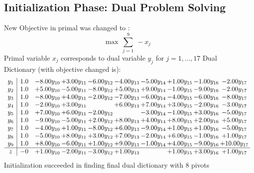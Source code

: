 \documentclass[9pt]{article}
\begin{document}
\subsection{Initialization Phase: Dual Problem Solving}
New Objective in primal was changed to : \[ \max\ \sum_{j=1}^{9}\ - x_j \] 
Primal variable $x_j$ corresponds to dual variable $y_j$ for $j = 1,\ldots,17$
Dual Dictionary (with objective changed is): 
\[\begin{array}{c| c c@{\hskip 2pt} c@{\hskip 2pt} c@{\hskip 2pt} c@{\hskip 2pt} c@{\hskip 2pt} c@{\hskip 2pt} c@{\hskip 2pt} c@{\hskip 2pt} }
 y_{1}   &  1.0 & -8.00 y_{10} & +  3.00 y_{11} & -6.00 y_{12} & -4.00 y_{13} & -5.00 y_{14} & +  1.00 y_{15} & -1.00 y_{16} & -2.00 y_{17}\\
 y_{2}   &  1.0 & +  5.00 y_{10} & -5.00 y_{11} & -8.00 y_{12} & +  5.00 y_{13} & +  9.00 y_{14} & -1.00 y_{15} & -9.00 y_{16} & -2.00 y_{17}\\
 y_{3}   &  1.0 & -8.00 y_{10} & +  4.00 y_{11} & -2.00 y_{12} & -7.00 y_{13} & -6.00 y_{14} & -4.00 y_{15} & -6.00 y_{16} & -8.00 y_{17}\\
 y_{4}   &  1.0 & -2.00 y_{10} & +  3.00 y_{11} &   & +  6.00 y_{13} & +  7.00 y_{14} & +  3.00 y_{15} & -2.00 y_{16} & -3.00 y_{17}\\
 y_{5}   &  1.0 & +  7.00 y_{10} & +  6.00 y_{11} & -2.00 y_{12} &   & -3.00 y_{14} & -1.00 y_{15} & +  3.00 y_{16} & -5.00 y_{17}\\
 y_{6}   &  1.0 & -9.00 y_{10} & -5.00 y_{11} & +  2.00 y_{12} & +  8.00 y_{13} & +  4.00 y_{14} & +  8.00 y_{15} & +  2.00 y_{16} & +  5.00 y_{17}\\
 y_{7}   &  1.0 & -4.00 y_{10} & +  1.00 y_{11} & -8.00 y_{12} & +  6.00 y_{13} & -9.00 y_{14} & +  1.00 y_{15} & +  1.00 y_{16} & -5.00 y_{17}\\
 y_{8}   &  1.0 & -5.00 y_{10} & +  8.00 y_{11} & +  3.00 y_{12} & +  7.00 y_{13} & -2.00 y_{14} & +  6.00 y_{15} & -1.00 y_{16} & +  1.00 y_{17}\\
 y_{9}   &  1.0 & +  8.00 y_{10} & -6.00 y_{11} & +  1.00 y_{12} & +  9.00 y_{13} & -1.00 y_{14} & +  4.00 y_{15} & -9.00 y_{16} & + 10.00 y_{17}\\
\hline
z    &  -0 & +  1.00 y_{10} & -2.00 y_{11} & -3.00 y_{12} & +  1.00 y_{13} &   & +  1.00 y_{15} & +  3.00 y_{16} & +  1.00 y_{17}\\
\end{array}\]
Initialization succeeded in finding final dual dictionary with 8 pivots
\end{document}
